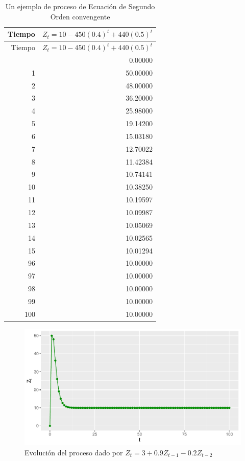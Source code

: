 \documentclass[
]{book}
\begin{document}
\begin{longtable}[]{@{}rr@{}}
\caption{\label{tab:table2}Un ejemplo de proceso de Ecuación de Segundo Orden convengente}\tabularnewline
\toprule\noalign{}
Tiempo & \(Z_t =10-450(0.4)^t+440(0.5)^t\) \\
\midrule\noalign{}
\endfirsthead
\toprule\noalign{}
Tiempo & \(Z_t =10-450(0.4)^t+440(0.5)^t\) \\
\midrule\noalign{}
\endhead
\bottomrule\noalign{}
\endlastfoot
0 & 0.00000 \\
1 & 50.00000 \\
2 & 48.00000 \\
3 & 36.20000 \\
4 & 25.98000 \\
5 & 19.14200 \\
6 & 15.03180 \\
7 & 12.70022 \\
8 & 11.42384 \\
9 & 10.74141 \\
10 & 10.38250 \\
11 & 10.19597 \\
12 & 10.09987 \\
13 & 10.05069 \\
14 & 10.02565 \\
15 & 10.01294 \\
96 & 10.00000 \\
97 & 10.00000 \\
98 & 10.00000 \\
99 & 10.00000 \\
100 & 10.00000 \\
\end{longtable}

\begin{figure}

{\centering \includegraphics{bookdown-demo_files/figure-latex/fig23-1} 

}

\caption{Evolución del proceso dado por $Z_t =3+0.9Z_{t-1}-0.2Z_{t-2}$}\label{fig:fig23}
\end{figure}
\end{document}
